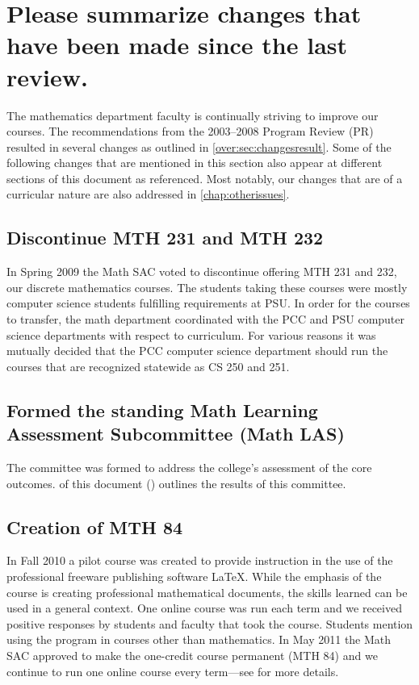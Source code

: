 
\section[Changes since the last program review]{Please summarize changes that have been made since the last
review.}
The mathematics department faculty is continually striving to improve our
courses.  The recommendations from the 2003--2008 Program Review (PR) \cite{mathprogramreview2003}
resulted in several changes as outlined in \vref{over:sec:changesresult}.  Some of the following
changes that are mentioned in this section also appear at different sections of this document
as referenced. Most notably, our changes that are of a curricular nature are also addressed in  \vref{chap:otherissues}.

\subsection{Discontinue MTH 231 and MTH 232} In Spring 2009
the Math SAC voted to discontinue offering MTH
231 and 232, our discrete mathematics courses.  The students taking these
courses were mostly computer science students fulfilling requirements at
PSU.  In order for the courses to transfer, the math department coordinated
with the PCC and PSU computer science departments with respect to
curriculum.  For various reasons it was mutually decided that the PCC
computer science department should run the courses that are recognized
statewide as CS 250 and 251.
\subsection{Formed the standing Math Learning Assessment Subcommittee
(Math LAS)}
The committee was formed to address the college's assessment of the core
outcomes.   of this document ()
outlines the results of this committee.
\subsection{Creation of MTH 84} In Fall 2010 a pilot course was created to provide
instruction in the use of the professional freeware publishing software
\LaTeX.   While the emphasis of the course is creating professional
mathematical documents, the skills learned can be used in a general context.
One online course was run each term and we received positive responses by
students and faculty that took the course.  Students mention using the
program in courses other than mathematics.   In May 2011 the Math SAC
approved to make the one-credit course permanent (MTH 84) and we continue to run one
online course every term---see  for more details.
